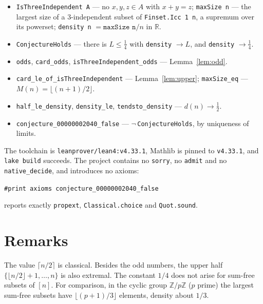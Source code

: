 \documentclass[11pt]{article}
\theoremstyle{plain}
\theoremstyle{definition}
\theoremstyle{remark}
\begin{document}
\begin{itemize}
  \item \texttt{IsThreeIndependent A} --- no $x,y,z\in A$ with $x+y=z$;
    \texttt{maxSize n} --- the largest size of a 3-independent subset of
    \texttt{Finset.Icc 1 n}, a supremum over its powerset;
    \texttt{density n} $=\texttt{maxSize n}/n$ in $\mathbb R$.
  \item \texttt{ConjectureHolds} --- there is $L\le\frac14$ with
    \texttt{density} $\to L$, and \texttt{density} $\to\frac14$.
  \item \texttt{odds}, \texttt{card\_odds}, \texttt{isThreeIndependent\_odds}
    --- Lemma~\ref{lem:odd}.
  \item \texttt{card\_le\_of\_isThreeIndependent} --- Lemma~\ref{lem:upper};
    \texttt{maxSize\_eq} --- $M(n)=\lfloor(n+1)/2\rfloor$.
  \item \texttt{half\_le\_density}, \texttt{density\_le},
    \texttt{tendsto\_density} --- $d(n)\to\frac12$.
  \item \texttt{conjecture\_00000002040\_false} ---
    $\lnot\,$\texttt{ConjectureHolds}, by uniqueness of limits.
\end{itemize}

The toolchain is \texttt{leanprover/lean4:v4.33.1}, Mathlib is pinned to
\texttt{v4.33.1}, and \texttt{lake build} succeeds. The project contains no
\texttt{sorry}, no \texttt{admit} and no \texttt{native\_decide}, and
introduces no axioms:
\begin{center}
\texttt{\#print axioms conjecture\_00000002040\_false}
\end{center}
reports exactly \texttt{propext}, \texttt{Classical.choice} and
\texttt{Quot.sound}.

\section{Remarks}

The value $\lceil n/2\rceil$ is classical. Besides the odd numbers, the upper
half $\{\lfloor n/2\rfloor+1,\ldots,n\}$ is also extremal. The constant $1/4$
does not arise for sum-free subsets of $[n]$. For comparison, in the cyclic
group $\mathbb Z/p\mathbb Z$ ($p$ prime) the largest sum-free subsets have
$\lfloor(p+1)/3\rfloor$ elements, density about $1/3$.
\end{document}
